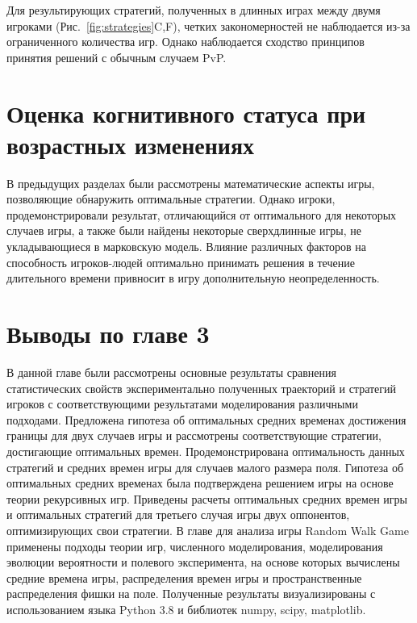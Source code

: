 Для результирующих стратегий, полученных в длинных играх между двумя игроками (Рис.~\cref{fig:strategies}C,F), четких закономерностей не наблюдается из-за ограниченного количества игр. Однако наблюдается сходство принципов принятия решений с обычным случаем PvP.

\section{Оценка когнитивного статуса при возрастных изменениях}\label{sec:ch3/sec5}

В предыдущих разделах были рассмотрены математические аспекты игры, позволяющие обнаружить оптимальные стратегии. Однако игроки, продемонстрировали результат, отличающийся от оптимального для некоторых случаев игры, а также были найдены некоторые сверхдлинные игры, не укладывающиеся в марковскую модель. Влияние различных факторов на способность игроков-людей оптимально принимать решения в течение длительного времени привносит в игру дополнительную неопределенность. 

\section{Выводы по главе 3}\label{sec:ch3/sec6}

В данной главе были рассмотрены основные результаты сравнения статистических свойств экспериментально полученных траекторий и стратегий игроков с соответствующими результатами моделирования различными подходами. Предложена гипотеза об оптимальных средних временах достижения границы для двух случаев игры и рассмотрены соответствующие стратегии, достигающие оптимальных времен. Продемонстрирована оптимальность данных стратегий и средних времен игры для случаев малого размера поля. Гипотеза об оптимальных средних временах была подтверждена решением игры на основе теории рекурсивных игр. Приведены расчеты оптимальных средних времен игры и оптимальных стратегий для третьего случая игры двух оппонентов, оптимизирующих свои стратегии. В главе для анализа игры Random Walk Game применены подходы теории игр, численного моделирования, моделирования эволюции вероятности и полевого эксперимента, на основе которых вычислены средние времена игры, распределения времен игры и пространственные распределения фишки на поле. Полученные результаты визуализированы с использованием языка Python 3.8 и библиотек numpy, scipy, matplotlib. 
